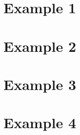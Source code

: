 \label{appendixB}

\section*{Example 1}


\newpage

\section*{Example 2}


\newpage

\section*{Example 3}


\newpage

\section*{Example 4}

